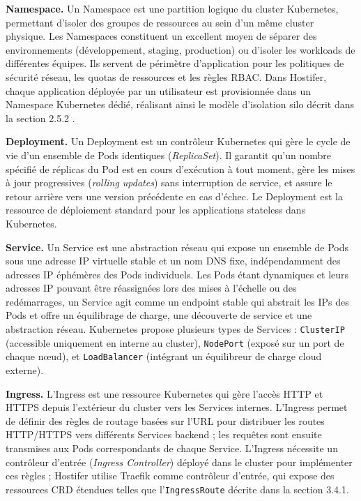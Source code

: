 \textbf{Namespace.} Un Namespace est une partition logique du cluster Kubernetes, permettant d'isoler des groupes de ressources au sein d'un même cluster physique. Les Namespaces constituent un excellent moyen de séparer des environnements (développement, staging, production) ou d'isoler les workloads de différentes équipes.  Ils servent de périmètre d'application pour les politiques de sécurité réseau, les quotas de ressources et les règles RBAC. Dans Hostifer, chaque application déployée par un utilisateur est provisionnée dans un Namespace Kubernetes dédié, réalisant ainsi le modèle d'isolation silo décrit dans la section 2.5.2 \cite{k8s-concepts}.

\textbf{Deployment.} Un Deployment est un contrôleur Kubernetes qui gère le cycle de vie d'un ensemble de Pods identiques (\textit{ReplicaSet}). Il garantit qu'un nombre spécifié de réplicas du Pod est en cours d'exécution à tout moment, gère les mises à jour progressives (\textit{rolling updates}) sans interruption de service, et assure le retour arrière vers une version précédente en cas d'échec. Le Deployment est la ressource de déploiement standard pour les applications stateless dans Kubernetes.

\textbf{Service.} Un Service est une abstraction réseau qui expose un ensemble de Pods sous une adresse IP virtuelle stable et un nom DNS fixe, indépendamment des adresses IP éphémères des Pods individuels. Les Pods étant dynamiques et leurs adresses IP pouvant être réassignées lors des mises à l'échelle ou des redémarrages, un Service agit comme un endpoint stable qui abstrait les IPs des Pods et offre un équilibrage de charge, une découverte de service et une abstraction réseau.  Kubernetes propose plusieurs types de Services : \texttt{ClusterIP} (accessible uniquement en interne au cluster), \texttt{NodePort} (exposé sur un port de chaque nœud), et \texttt{LoadBalancer} (intégrant un équilibreur de charge cloud externe).

\textbf{Ingress.} L'Ingress est une ressource Kubernetes qui gère l'accès HTTP et HTTPS depuis l'extérieur du cluster vers les Services internes. L'Ingress permet de définir des règles de routage basées sur l'URL pour distribuer les routes HTTP/HTTPS vers différents Services backend ; les requêtes sont ensuite transmises aux Pods correspondants de chaque Service.  L'Ingress nécessite un contrôleur d'entrée (\textit{Ingress Controller}) déployé dans le cluster pour implémenter ces règles ; Hostifer utilise Traefik comme contrôleur d'entrée, qui expose des ressources CRD étendues telles que l'\texttt{IngressRoute} décrite dans la section 3.4.1.

